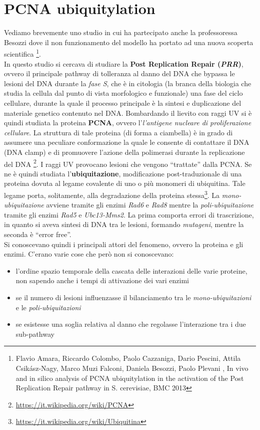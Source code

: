 \documentclass[a4paper,12pt, oneside]{book}
\begin{document}
\section{PCNA ubiquitylation}
Vediamo brevemente uno studio in cui ha partecipato anche la professoressa
Besozzi dove il non funzionamento del modello ha portato ad una nuova scoperta
scientifica \footnote{
  Flavio Amara, Riccardo Colombo, Paolo Cazzaniga, Dario Pescini, Attila
  Csikász-Nagy, Marco Muzi Falconi, Daniela Besozzi, Paolo Plevani , In vivo and
  in silico analysis of PCNA ubiquitylation in the activation of the 
  Post Replication Repair pathway in S. cerevisiae, BMC 2013 }.\\
In questo studio si cercava di studiare la \textbf{Post Replication Repair
  (\textit{PRR})}, ovvero il principale pathway di tolleranza al danno del DNA
che bypassa le lesioni del DNA durante la \textit{fase S}, che è in citologia
(la branca della biologia che studia la cellula dal punto di vista morfologico e
funzionale) una fase del ciclo cellulare, durante la quale il processo
principale è la sintesi e duplicazione del materiale genetico contenuto nel
DNA. Bombardando il lievito con raggi UV si è quindi studiata la proteina
\textbf{PCNA}, ovvero l'\textit{l'antigene nucleare di proliferazione
  cellulare}. La struttura di tale proteina (di forma a ciambella) è in grado di
assumere una peculiare conformazione la quale le consente di contattare il DNA
(DNA clamp) e di promuovere l'azione della polimerasi durante la replicazione
del DNA \footnote{\url{https://it.wikipedia.org/wiki/PCNA}}. I raggi UV
provocano lesioni che vengono ``trattate'' dalla PCNA. Se ne è quindi
studiata l'\textbf{ubiquitazione}, modificazione post-traduzionale di una
proteina dovuta al legame covalente di uno o più monomeri di ubiquitina. Tale
legame porta, solitamente, alla degradazione della proteina
stessa\footnote{\url{https://it.wikipedia.org/wiki/Ubiquitina}}. La
\textit{mono-ubiquitazione} avviene tramite gli enzimi \textit{Rad6} e
\textit{Rad8} mentre la \textit{poli-ubiquitazione} tramite gli enzimi
\textit{Rad5} e \textit{Ubc13-Mms2}. La prima comporta errori di trascrizione,
in quanto si aveva sintesi di DNA tra le lesioni, formando \textit{mutageni},
mentre la seconda è ``error free''.\\
Si conoscevano quindi i principali attori del fenomeno, ovvero la proteina e gli
enzimi. C'erano varie cose che però non si conoscevano:
\begin{itemize}
  \item l'ordine spazio temporale della cascata delle interazioni delle varie
  proteine, non sapendo anche i tempi di attivazione dei vari enzimi
  \item se il numero di lesioni influenzasse il bilanciamento tra le
  \textit{mono-ubiquitazioni} e le \textit{poli-ubiquitazioni}
  \item se esistesse una soglia relativa al danno che regolasse l'interazione
  tra i due sub-pathway
\end{itemize}
\end{document}
